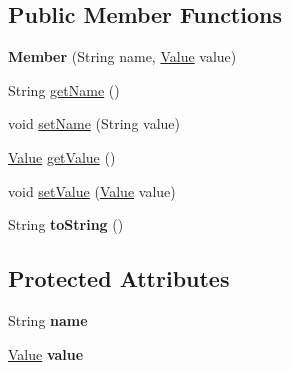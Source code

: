 \subsection*{Public Member Functions}
\begin{DoxyCompactItemize}
\item 
\mbox{\label{classcom_1_1mysql_1_1fabric_1_1xmlrpc_1_1base_1_1_member_a4868d572601096175654cad1b4289d0d}} 
{\bfseries Member} (String name, \mbox{\hyperlink{classcom_1_1mysql_1_1fabric_1_1xmlrpc_1_1base_1_1_value}{Value}} value)
\item 
String \mbox{\hyperlink{classcom_1_1mysql_1_1fabric_1_1xmlrpc_1_1base_1_1_member_ae78ad78035cc14f85e886df3ca5037ab}{get\+Name}} ()
\item 
void \mbox{\hyperlink{classcom_1_1mysql_1_1fabric_1_1xmlrpc_1_1base_1_1_member_a86915aae7a94623e9cf7952d547f3462}{set\+Name}} (String value)
\item 
\mbox{\hyperlink{classcom_1_1mysql_1_1fabric_1_1xmlrpc_1_1base_1_1_value}{Value}} \mbox{\hyperlink{classcom_1_1mysql_1_1fabric_1_1xmlrpc_1_1base_1_1_member_a949b7502bbdf964b8b7e314a12f11c60}{get\+Value}} ()
\item 
void \mbox{\hyperlink{classcom_1_1mysql_1_1fabric_1_1xmlrpc_1_1base_1_1_member_af953552bee1c2af80d3d4fba98f02088}{set\+Value}} (\mbox{\hyperlink{classcom_1_1mysql_1_1fabric_1_1xmlrpc_1_1base_1_1_value}{Value}} value)
\item 
\mbox{\label{classcom_1_1mysql_1_1fabric_1_1xmlrpc_1_1base_1_1_member_a0d1406fcf7eeb49597212c7e309a7b85}} 
String {\bfseries to\+String} ()
\end{DoxyCompactItemize}
\subsection*{Protected Attributes}
\begin{DoxyCompactItemize}
\item 
\mbox{\label{classcom_1_1mysql_1_1fabric_1_1xmlrpc_1_1base_1_1_member_a769ecd86f590e1b101d075fa284d969e}} 
String {\bfseries name}
\item 
\mbox{\label{classcom_1_1mysql_1_1fabric_1_1xmlrpc_1_1base_1_1_member_af03dfbe474aa5f279c78431a4851b339}} 
\mbox{\hyperlink{classcom_1_1mysql_1_1fabric_1_1xmlrpc_1_1base_1_1_value}{Value}} {\bfseries value}
\end{DoxyCompactItemize}


